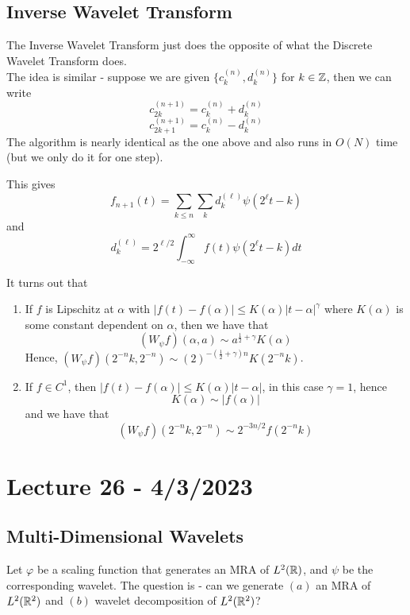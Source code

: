 \documentclass{article}
\begin{document}
\subsection{Inverse Wavelet Transform}

The Inverse Wavelet Transform just does the opposite of what the Discrete Wavelet Transform does.\\

The idea is similar - suppose we are given $\{c_k^{(n)}, d_k^{(n)}\}$ for $k \in \mathbb{Z}$, then we can write
\[c_{2k}^{(n+1)} = c_k^{(n)} + d_k^{(n)}\]
\[c_{2k+1}^{(n+1)} = c_k^{(n)} - d_k^{(n)}\]
The algorithm is nearly identical as the one above and also runs in $O(N)$ time (but we only do it for one step).

This gives
\[f_{n+1}(t) = \sum_{k \leq n} \sum_k d_k^{(\ell)} \psi(2^\ell t - k)\]
and
\[d_k^{(\ell)} = 2^{\ell/2} \int_{-\infty}^{\infty} f(t) \psi(2^\ell t - k) dt\]

\begin{remark}
    It turns out that
    \begin{enumerate}
        \item If $f$ is Lipschitz at $\alpha$ with $|f(t) - f(\alpha)| \leq K(\alpha) |t - \alpha|^\gamma$ where $K(\alpha)$ is some constant dependent on $\alpha$, then we have that
        \[(W_\psi f)(\alpha, a) \sim a^{\frac{1}{2} + \gamma} K(\alpha)\]
        Hence, $(W_\psi f)(2^{-n} k, 2^{-n}) \sim (2)^{-(\frac{1}{2} + \gamma)n} K(2^{-n} k)$.
        \item If $f \in C^1$, then $|f(t) - f(\alpha)| \leq K(\alpha) |t - \alpha|$, in this case $\gamma = 1$, hence
        \[K(\alpha) \sim |f(\alpha)|\]
        and we have that
        \[(W_\psi f)(2^{-n} k, 2^{-n}) \sim 2^{-3n/2} f(2^{-n} k)\]
    \end{enumerate}
\end{remark}

\newpage
\section{Lecture 26 - 4/3/2023}

\subsection{Multi-Dimensional Wavelets}

Let $\varphi$ be a scaling function that generates an MRA of $L^2(\mathbb{R})$, and $\psi$ be the corresponding wavelet. The question is - can we generate $(a)$ an MRA of $L^2(\mathbb{R}^2)$ and $(b)$ wavelet decomposition of $L^2(\mathbb{R}^2)$?\\
\end{document}
